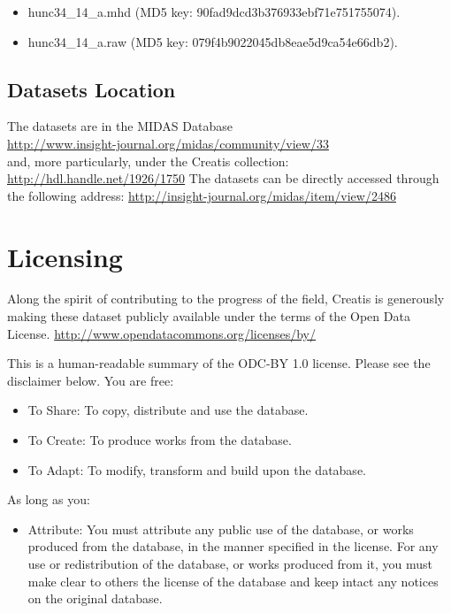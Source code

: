 \documentclass{InsightArticle}
\begin{document}
\begin{itemize}
\item hunc34\_14\_a.mhd (MD5 key: 90fad9dcd3b376933ebf71e751755074).
\item hunc34\_14\_a.raw (MD5 key: 079f4b9022045db8eae5d9ca54e66db2).
\end{itemize}



\subsection{Datasets Location}

The datasets are in the MIDAS Database\\
\url{http://www.insight-journal.org/midas/community/view/33} \\
and, more particularly, under the Creatis collection:
\url{http://hdl.handle.net/1926/1750}
The datasets can be directly accessed through the following address:
\url{http://insight-journal.org/midas/item/view/2486}

\section{Licensing}

Along the spirit of contributing to the progress of the field, Creatis is
generously making these dataset publicly available under the terms of the Open
Data License.
\url{http://www.opendatacommons.org/licenses/by/}

This is a human-readable summary of the ODC-BY 1.0 license. Please see the disclaimer below.
You are free:\\

\begin{itemize}
\item To Share: To copy, distribute and use the database.
\item To Create: To produce works from the database.
\item To Adapt: To modify, transform and build upon the database.
\end{itemize}

As long as you:\\

\begin{itemize}
\item Attribute: You must attribute any public use of the database, or works
produced from the database, in the manner specified in the license. For any use
or redistribution of the database, or works produced from it, you must make
clear to others the license of the database and keep intact any notices on the
original database.
\end{itemize}
\end{document}
